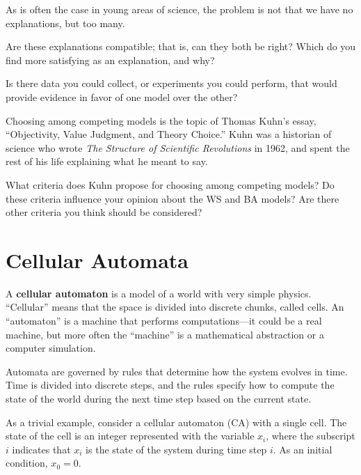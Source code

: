 \documentclass[10pt]{book}
\begin{document}
As is often the case in young areas of science, the problem is
not that we have no explanations, but too many.

\begin{exercise}

Are these explanations compatible; that is, can they both be right?
Which do you find more satisfying as an explanation, and why?

Is there data you could collect, or experiments you could perform,
that would provide evidence in favor of one model over the other?

Choosing among competing models is the topic of Thomas Kuhn's
essay, ``Objectivity, Value Judgment, and Theory Choice.''
Kuhn was a historian of science who wrote {\em The
Structure of Scientific Revolutions} in 1962, and spent the rest of
his life explaining what he meant to say.

What criteria does Kuhn propose for choosing among competing models?
Do these criteria influence your opinion about the WS and BA models?
Are there other criteria you think should be considered?

\end{exercise}



\chapter{Cellular Automata}
\label{automata}

A {\bf cellular automaton} is a model of a world with very simple physics.
``Cellular'' means that the space is divided into discrete chunks,
called cells.  An ``automaton'' is a machine that performs
computations---it could be a real machine, but more often the
``machine'' is a mathematical abstraction or a computer simulation.

Automata are governed by rules that determine how the system evolves
in time.  Time is divided into discrete steps, and the rules
specify how to compute the state of the world during the next time
step based on the current state.

As a trivial example, consider a cellular automaton (CA) with
a single cell.  The state of the cell is an integer represented
with the variable $x_i$, where the subscript $i$ indicates
that $x_i$ is the state of the system during time step $i$.
As an initial condition, $x_0 = 0$.
\end{document}
